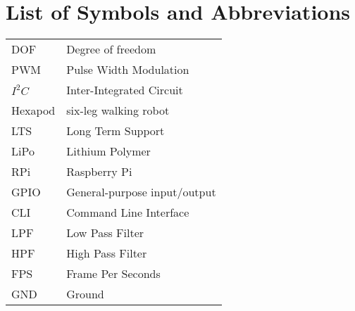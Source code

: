 


\usepackage[colorinlistoftodos]{todonotes}


\pagestyle{empty}


\maketitle 						%

\frontmatter %
\pagestyle{fancy}



\tableofcontents
\listoffigures
\listoftables
\listofalgorithms


\chapter*{List of Symbols and Abbreviations}

\begin{tabular}{l l}
	DOF      & Degree of freedom    \\
	PWM     & Pulse Width Modulation       \\
	$I^2C$  & Inter-Integrated Circuit     \\
	Hexapod & six-leg walking robot\\
	LTS     & Long Term Support     \\
	LiPo     & Lithium Polymer      \\
	RPi      & Raspberry Pi \\
	GPIO   & General-purpose input/output \\
	CLI    & Command Line Interface  \\
	LPF     & Low Pass Filter      \\
	HPF    & High Pass Filter     \\
	FPS     & Frame Per Seconds    \\
	GND   & Ground
\end{tabular} 


